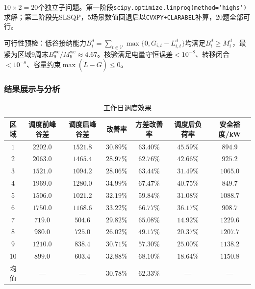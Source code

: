 \documentclass[a4paper,12pt]{ctexart}
\begin{document}
$10\times2=20$个独立子问题。第一阶段\texttt{scipy.optimize.linprog(method='highs')}求解；第二阶段先SLSQP，$5$场景数值回退后以\texttt{CVXPY+CLARABEL}补算，$20$题全部可行。

可行性预检：低谷接纳能力$B_{i}^{d}=\sum_{t\in\mathcal{V}}\max\{0,G_{i,t}-L_{i,t}^{d}\}$均满足$B_{i}^{d}\ge M_{i}^{d}$，最紧为区域$9$周末$B_{9}^{\mathrm{we}}/M_{9}^{\mathrm{we}}\approx4.67$。核验满足电量守恒误差$<10^{-8}$、转移闭合$<10^{-8}$、容量约束$\max(\widetilde{L}-G)\le0$。


\subsubsection{结果展示与分析}

\begin{table}[H]
\centering
\caption{工作日调度效果}
\begin{tabular}{ccccccc}
\toprule
区域 & 调度前峰谷差 & 调度后峰谷差 & 改善率 & 方差改善率 & 调度后负荷率 & 安全裕度/kW \\
\midrule
$1$ & $2202.0$ & $1521.8$ & $30.89\%$ & $63.40\%$ & $45.59\%$ & $894.9$ \\
$2$ & $2063.0$ & $1465.4$ & $28.97\%$ & $62.76\%$ & $42.66\%$ & $925.2$ \\
$3$ & $1521.0$ & $1094.2$ & $28.06\%$ & $63.44\%$ & $31.49\%$ & $1065.0$ \\
$4$ & $1969.0$ & $1280.0$ & $\mathbf{34.99\%}$ & $67.47\%$ & $40.75\%$ & $849.7$ \\
$5$ & $1506.0$ & $1021.2$ & $32.19\%$ & $59.84\%$ & $31.08\%$ & $1088.7$ \\
$6$ & $1750.0$ & $1168.6$ & $33.22\%$ & $66.77\%$ & $36.17\%$ & $908.7$ \\
$7$ & $719.0$ & $504.6$ & $29.82\%$ & $65.08\%$ & $14.92\%$ & $1229.6$ \\
$8$ & $980.0$ & $725.0$ & $26.02\%$ & $49.17\%$ & $20.37\%$ & $1207.7$ \\
$9$ & $1210.0$ & $838.4$ & $30.71\%$ & $57.30\%$ & $25.00\%$ & $1138.2$ \\
$10$ & $899.0$ & $603.4$ & $32.88\%$ & $\mathbf{68.10\%}$ & $18.64\%$ & $1150.8$ \\
\midrule
均值 & --- & --- & $\mathbf{30.78\%}$ & $\mathbf{62.33\%}$ & --- & --- \\
\bottomrule
\end{tabular}
\end{table}
\end{document}
